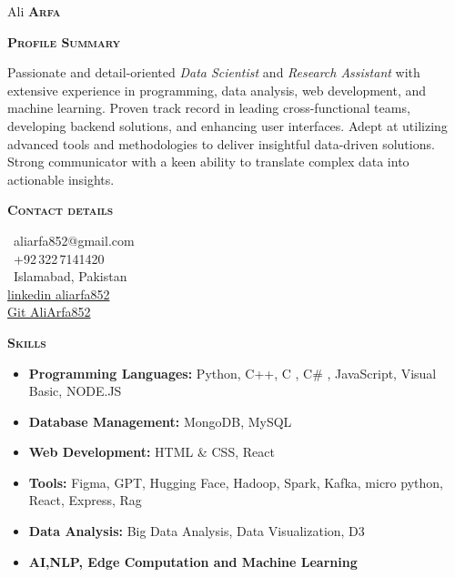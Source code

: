 \documentclass[11pt, a4paper]{article}
\newcommand{\headleft}[1]{\vspace*{3ex}\textsc{\textbf{#1}}\par%
    \vspace*{-1.5ex}\hrulefill\par\vspace*{0.7ex}}
\begin{document}
\setlength{\topskip}{0pt}
\setlength{\parindent}{0pt}
\setlength{\parskip}{0pt}
\setlength{\fboxsep}{0pt}
\pagestyle{empty}
\raggedbottom

\begin{minipage}[t]{0.33\textwidth} %
\colorbox{cvblue}{\begin{minipage}[t][5mm][t]{\textwidth}\null\hfill\null\end{minipage}}

\vspace{-.2ex} %
\colorbox{cvblue!90}{\color{white}  %
\textwidth\relax%
\begin{minipage}[t][293mm][t]{0.82\textwidth}
\raggedright
\vspace*{2.5ex}

\Large Ali \textbf{\textsc{Arfa}} \normalsize 

\vspace*{0.5ex} %

\headleft{Profile Summary}
Passionate and detail-oriented \textit{Data Scientist} and \textit{Research Assistant} with extensive experience in programming, data analysis, web development, and machine learning. Proven track record in leading cross-functional teams, developing backend solutions, and enhancing user interfaces. Adept at utilizing advanced tools and methodologies to deliver insightful data-driven solutions. Strong communicator with a keen ability to translate complex data into actionable insights.

\headleft{Contact details}
\small %
\MVAt\ {\small aliarfa852@gmail.com} \\[0.4ex]
\Mobilefone\ +92\,322\,7141420 \\[0.5ex]
\Letter\ Islamabad, Pakistan\\
\hyperlink{www.linkedin.com/in/aliarfa852}{linkedin aliarfa852}\\
\hyperlink{https://github.com/AliArfa852}{Git AliArfa852}


\normalsize

\headleft{Skills}
\begin{itemize}
\item \textbf{Programming Languages:} Python, C++, C , C# , JavaScript, Visual Basic, NODE.JS
\item \textbf{Database Management:} MongoDB, MySQL
\item \textbf{Web Development:} HTML \& CSS, React
\item \textbf{Tools:} Figma, GPT, Hugging Face, Hadoop, Spark, Kafka, micro python, React, Express, Rag
\item \textbf{Data Analysis:} Big Data Analysis, Data Visualization, D3
\item \textbf{AI,NLP, Edge Computation and Machine Learning}
\end{itemize} 

\end{minipage}%
\textwidth\relax%
}
\end{minipage}%
\end{document}
